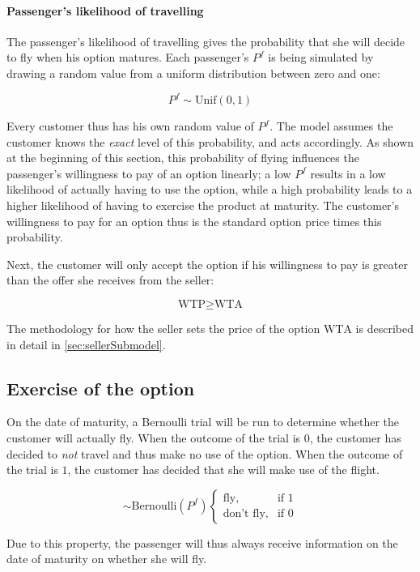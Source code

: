 \paragraph{Passenger's likelihood of travelling}
The passenger's likelihood of travelling gives the probability that she will decide to fly when his option matures. Each passenger's $P^f$ is being simulated by drawing a random value from a uniform distribution between zero and one:

$$ P^f \sim \mbox{Unif}(0, 1)$$

Every customer thus has his own random value of $P^f$. The model assumes the customer knows the \emph{exact} level of this probability, and acts accordingly. As shown at the beginning of this section, this probability of flying influences the passenger's willingness to pay of an option linearly; a low $P^f$ results in a low likelihood of actually having to use the option, while a high probability leads to a higher likelihood of having to exercise the product at maturity. The customer's willingness to pay for an option thus is the standard option price times this probability.

Next, the customer will only accept the option if his willingness to pay is greater than the offer she receives from the seller:

$$ \mbox{WTP} \ge \mbox{WTA} $$

The methodology for how the seller sets the price of the option $\mbox{WTA}$ is described in detail in \autoref{sec:sellerSubmodel}.


\subsection{Exercise of the option}
On the date of maturity, a Bernoulli trial will be run to determine whether the customer will actually fly. When the outcome of the trial is $0$, the customer has decided to \emph{not} travel and thus make no use of the option. When the outcome of the trial is $1$, the customer has decided that she will make use of the flight.

\begin{equation}
\sim \mbox{Bernoulli}(P^f)\begin{cases}
     \mbox{fly}, & \mbox{if } 1 \\
    \mbox{don't fly}, & \mbox{if } 0 \end{cases}
\end{equation}

Due to this property, the passenger will thus always receive information on the date of maturity on whether she will fly.

